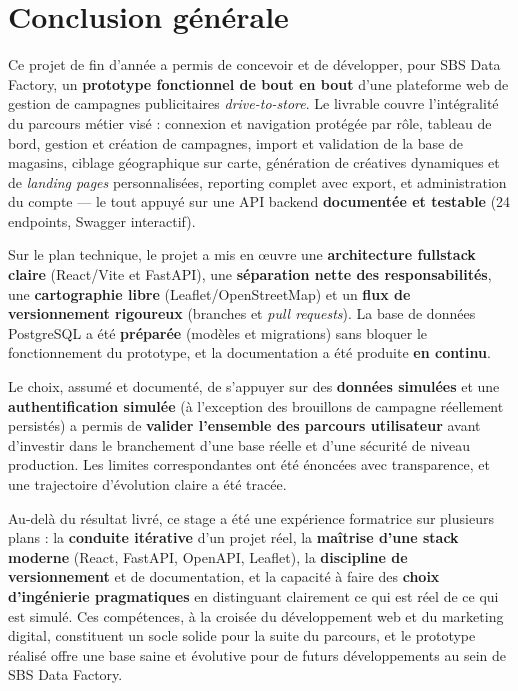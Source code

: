 \chapter{Conclusion générale}

Ce projet de fin d'année a permis de concevoir et de développer, pour SBS Data
Factory, un \textbf{prototype fonctionnel de bout en bout} d'une plateforme web
de gestion de campagnes publicitaires \emph{drive-to-store}. Le livrable couvre
l'intégralité du parcours métier visé : connexion et navigation protégée par
rôle, tableau de bord, gestion et création de campagnes, import et validation
de la base de magasins, ciblage géographique sur carte, génération de créatives
dynamiques et de \emph{landing pages} personnalisées, reporting complet avec
export, et administration du compte --- le tout appuyé sur une API backend
\textbf{documentée et testable} (24 endpoints, Swagger interactif).

Sur le plan technique, le projet a mis en \oe uvre une \textbf{architecture
fullstack claire} (React/Vite et FastAPI), une \textbf{séparation nette des
responsabilités}, une \textbf{cartographie libre} (Leaflet/OpenStreetMap) et un
\textbf{flux de versionnement rigoureux} (branches et \emph{pull requests}).
La base de données PostgreSQL a été \textbf{préparée} (modèles et migrations)
sans bloquer le fonctionnement du prototype, et la documentation a été produite
\textbf{en continu}.

Le choix, assumé et documenté, de s'appuyer sur des \textbf{données simulées} et
une \textbf{authentification simulée} (à l'exception des brouillons de campagne
réellement persistés) a permis de \textbf{valider l'ensemble des parcours
utilisateur} avant d'investir dans le branchement d'une base réelle et d'une
sécurité de niveau production. Les limites correspondantes ont été énoncées avec
transparence, et une trajectoire d'évolution claire a été tracée.

Au-delà du résultat livré, ce stage a été une expérience formatrice sur
plusieurs plans : la \textbf{conduite itérative} d'un projet réel, la
\textbf{maîtrise d'une stack moderne} (React, FastAPI, OpenAPI, Leaflet), la
\textbf{discipline de versionnement} et de documentation, et la capacité à
faire des \textbf{choix d'ingénierie pragmatiques} en distinguant clairement ce
qui est réel de ce qui est simulé. Ces compétences, à la croisée du
développement web et du marketing digital, constituent un socle solide pour la
suite du parcours, et le prototype réalisé offre une base saine et évolutive
pour de futurs développements au sein de SBS Data Factory.

